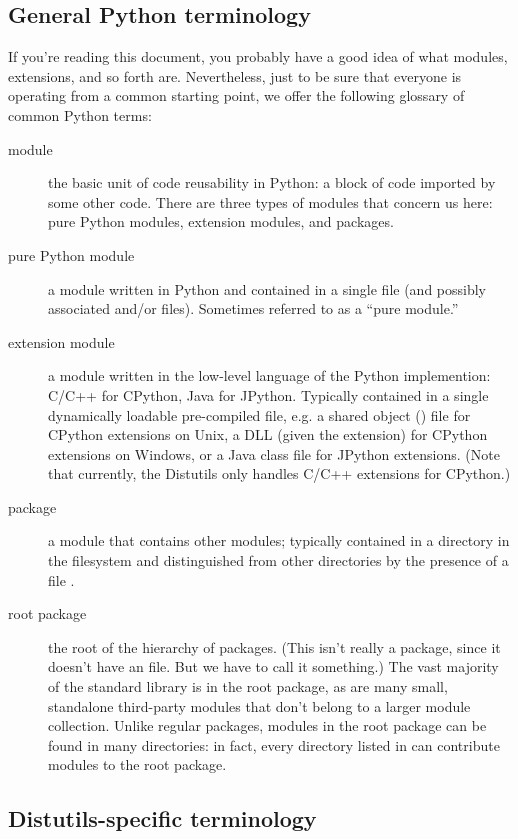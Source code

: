 \documentclass{howto}
\begin{document}
\subsection{General Python terminology}
\label{python-terms}

If you're reading this document, you probably have a good idea of what
modules, extensions, and so forth are.  Nevertheless, just to be sure
that everyone is operating from a common starting point, we offer the
following glossary of common Python terms:
\begin{description}
\item[module] the basic unit of code reusability in Python: a block of
  code imported by some other code.  There are three types of modules
  that concern us here: pure Python modules, extension modules, and
  packages.
\item[pure Python module] a module written in Python and contained in a
  single  file (and possibly associated  and/or
   files).  Sometimes referred to as a ``pure module.''
\item[extension module] a module written in the low-level language of
  the Python implemention: C/C++ for CPython, Java for JPython.
  Typically contained in a single dynamically loadable pre-compiled
  file, e.g. a shared object () file for CPython extensions on
  Unix, a DLL (given the  extension) for CPython extensions
  on Windows, or a Java class file for JPython extensions.  (Note that
  currently, the Distutils only handles C/C++ extensions for CPython.)
\item[package] a module that contains other modules; typically contained
  in a directory in the filesystem and distinguished from other
  directories by the presence of a file .
\item[root package] the root of the hierarchy of packages.  (This isn't
  really a package, since it doesn't have an 
  file.  But we have to call it something.)  The vast majority of the
  standard library is in the root package, as are many small, standalone
  third-party modules that don't belong to a larger module collection.
  Unlike regular packages, modules in the root package can be found in
  many directories: in fact, every directory listed in 
  can contribute modules to the root package.
\end{description}


\subsection{Distutils-specific terminology}
\label{distutils-term}
\end{document}
